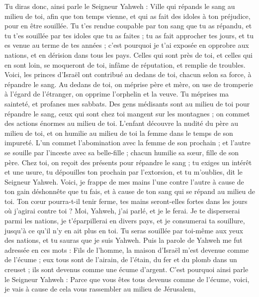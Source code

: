 \begin{multicols}{2}
Tu diras donc, ainsi parle le Seigneur Yahweh : Ville qui répands le sang au milieu de toi, afin que ton temps vienne, et qui as fait des idoles à ton préjudice, pour en être souillée.
Tu t'es rendue coupable par ton sang que tu as répandu, et tu t'es souillée par tes idoles que tu as faites ; tu as fait approcher tes jours, et tu es venue au terme de tes années ; c'est pourquoi je t'ai exposée en opprobre aux nations, et en dérision dans tous les pays.
Celles qui sont près de toi, et celles qui en sont loin, se moqueront de toi, infâme de réputation, et remplie de troubles.
Voici, les princes d'Israël ont contribué au dedans de toi, chacun selon sa force, à répandre le sang.
Au dedans de toi, on méprise père et mère, on use de tromperie à l'égard de l'étranger, on opprime l'orphelin et la veuve.
Tu méprises ma sainteté, et profanes mes sabbats.
Des gens médisants sont au milieu de toi pour répandre le sang, ceux qui sont chez toi mangent sur les montagnes ; on commet des actions énormes au milieu de toi.
L'enfant découvre la nudité du père au milieu de toi, et on humilie au milieu de toi la femme dans le temps de son impureté.
L'un commet l’abomination avec la femme de son prochain ; et l'autre se souille par l’inceste avec sa belle-fille ; chacun  humilie sa sœur, fille de son père.
Chez toi, on reçoit des présents pour répandre le sang ; tu exiges un intérêt et une usure, tu dépouilles ton prochain par l’extorsion, et tu m’oublies, dit le Seigneur Yahweh.
Voici, je frappe de mes mains l'une contre l'autre à cause de ton gain déshonnête que tu fais, et à cause de ton sang qui se répand au milieu de toi.
Ton cœur pourra-t-il tenir ferme, tes mains seront-elles fortes dans les jours où j'agirai contre toi ? Moi, Yahweh, j'ai parlé, et je le ferai.
Je te disperserai parmi les nations, je t’éparpillerai en divers pays, et je consumerai ta souillure, jusqu'à ce qu'il n'y en ait plus en toi.
Tu seras souillée par toi-même aux yeux des nations, et tu sauras que je suis Yahweh.
Puis la parole de Yahweh me fut adressée en ces mots :
Fils de l’homme, la maison d'Israël m'est devenue comme de l'écume ; eux tous sont de l'airain, de l'étain, du fer et du plomb dans un creuset ; ils sont devenus comme une écume d'argent.
C'est pourquoi ainsi parle le Seigneur Yahweh : Parce que vous êtes tous devenus comme de l'écume, voici, je vais à cause de cela vous rassembler au milieu de Jérusalem,

\end{multicols}

